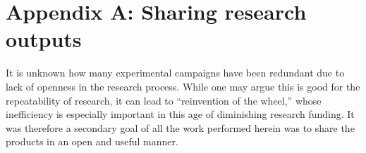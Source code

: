 \chapter*{Appendix A: Sharing research outputs}

It is unknown how many experimental campaigns have been redundant due to lack of
openness in the research process. While one may argue this is good for the
repeatability of research, it can lead to ``reinvention of the wheel,'' whose
inefficiency is especially important in this age of diminishing research
funding. It was therefore a secondary goal of all the work performed herein was
to share the products in an open and useful manner.